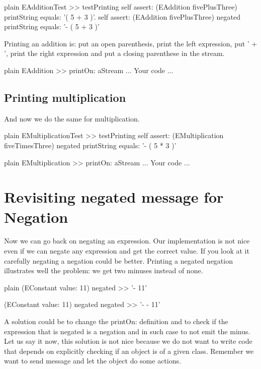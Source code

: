 \documentclass[10pt,twoside,english]{_support/latex/sbabook/sbabook}
\begin{document}
\begin{displaycode}{plain}
EAdditionTest >> testPrinting
	self assert: (EAddition fivePlusThree) printString equals:  '( 5 + 3 )'.
	self assert: (EAddition fivePlusThree) negated printString equals:  '- ( 5 + 3 )'
\end{displaycode}

Printing an addition is: put an open parenthesis, print the left expression, put ' + ', print the right expression and put a closing parenthese in the stream. 

\begin{displaycode}{plain}
EAddition >> printOn: aStream
	... Your code ...
\end{displaycode}
\subsection{Printing multiplication}
And now we do the same for multiplication. 

\begin{displaycode}{plain}
EMultiplicationTest >> testPrinting
	self assert: (EMultiplication fiveTimesThree) negated printString equals:  '- ( 5 * 3 )'
\end{displaycode}

\begin{displaycode}{plain}
EMultiplication >> printOn: aStream
	... Your code ...
\end{displaycode}
\section{Revisiting negated message for Negation}
Now we can go back on negating an expression. Our implementation is not nice even if we can negate any expression and get the correct value. If you look at it carefully negating a negation could be better. 
Printing a negated negation illustrates well the problem: we get two minuses instead of none. 

\begin{displaycode}{plain}
(EConstant value: 11) negated 
>> '- 11'

(EConstant value: 11) negated negated
>> '- - 11'
\end{displaycode}

A solution could be to change the printOn: definition and to check if the expression that is negated is a negation 
and in such case to not emit the minus. Let us say it now, this solution is not nice because we do not want to write code
that depends on explicitly checking if an object is of a given class. Remember we want to send message and let the object do some actions. 
\end{document}
